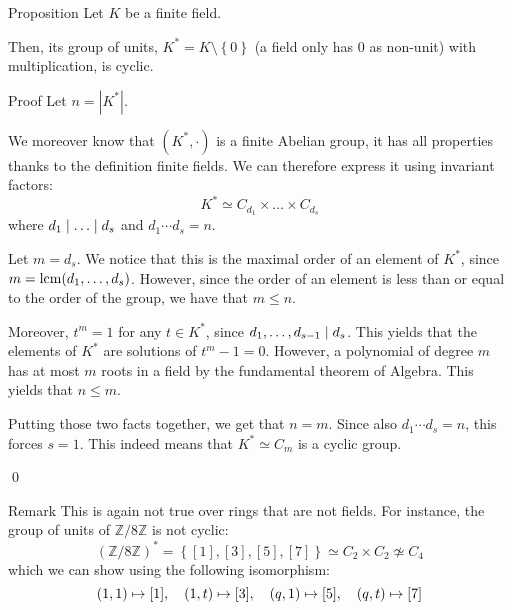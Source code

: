 \documentclass[a4paper]{article}
\begin{document}
\begin{parag}{Proposition}
    Let $K$ be a finite field.

    Then, its group of units, $K^* = K \setminus \left\{0\right\}$ (a field only has 0 as non-unit) with multiplication, is cyclic.

    \begin{subparag}{Proof}
        Let $n = \left|K^*\right|$. 

        We moreover know that $\left(K^*, \cdot \right)$ is a finite Abelian group, it has all properties thanks to the definition finite fields. We can therefore express it using invariant factors: 
        \[K^* \simeq C_{d_1} \times \ldots \times C_{d_s}\]
        where $d_1 \mid \ldots \mid d_s$ and $d_1 \cdots d_s = n$.

        Let $m = d_s$. We notice that this is the maximal order of an element of $K^*$, since $m = \lcm\left(d_1, \ldots, d_s\right)$. However, since the order of an element is less than or equal to the order of the group, we have that $m \leq n$.

        Moreover, $t^m = 1$ for any $t \in K^*$, since $d_1, \ldots, d_{s-1} \mid d_s$. This yields that the elements of $K^*$ are solutions of $t^m - 1 = 0$. However, a polynomial of degree $m$ has at most $m$ roots in a field by the fundamental theorem of Algebra. This yields that $n \leq m$.

        Putting those two facts together, we get that $n = m$. Since also $d_1 \cdots d_s = n$, this forces $s = 1$. This indeed means that $K^* \simeq C_m$ is a cyclic group.

        \qed
    \end{subparag}

    \begin{subparag}{Remark}
        This is again not true over rings that are not fields. For instance, the group of units of $\mathbb{Z}/8\mathbb{Z}$ is not cyclic: 
        \[\left(\mathbb{Z}/8\mathbb{Z}\right)^* = \left\{\left[1\right], \left[3\right], \left[5\right], \left[7\right]\right\} \simeq C_2 \times C_2 \not\simeq C_4\]
        which we can show using the following isomorphism: 
        \[\left(1, 1\right) \mapsto \left[1\right], \mathspace \left(1, t\right) \mapsto \left[3\right], \mathspace \left(q, 1\right) \mapsto \left[5\right], \mathspace \left(q, t\right) \mapsto \left[7\right]\]
    \end{subparag}
\end{parag}
\end{document}
